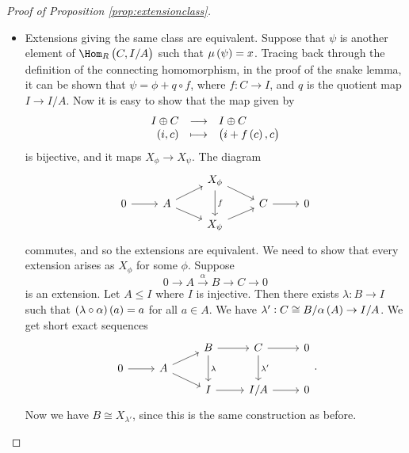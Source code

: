 \begin{proof}[Proof of Proposition \ref{prop:extensionclass}]
\begin{itemize}
From Lemma \ref{lem:extensionclass}, there is a commuting square
$$
\begin{tikzcd}[row sep=tiny]
\Hom_R\br{C, C} \arrow{dr}{\eta} \arrow[swap]{dd}{\overline{\phi}} & \\
& \Ext_R^1\br{C, A} \\
\Hom_R\br{C, I / A} \arrow[swap]{ur}{\mu} &
\end{tikzcd}.
$$
For $ f \in \Hom_R\br{C, C} $, $ \overline{\phi}\br{f} = \phi \circ f $. So the class of the extension
$$ 0 \to A \to B \to C \to 0 $$
is $ \eta\br{\id_C} = \mu\br{\phi \circ \id_C} = \mu\br{\phi} = x $.
\item Extensions giving the same class are equivalent. Suppose that $ \psi $ is another element of $ \Hom_R\br{C, I / A} $ such that $ \mu\br{\psi} = x $. Tracing back through the definition of the connecting homomorphism, in the proof of the snake lemma, it can be shown that $ \psi = \phi + q \circ f $, where $ f : C \to I $, and $ q $ is the quotient map $ I \to I / A $. Now it is easy to show that the map given by
$$ \function{I \oplus C}{I \oplus C}{\br{i, c}}{\br{i + f\br{c}, c}} $$
is bijective, and it maps $ X_\phi \to X_\psi $. The diagram
$$
\begin{tikzcd}[row sep=tiny]
& & X_\phi \arrow{dr} \arrow{dd}{f} & & \\
0 \arrow{r} & A \arrow{ur} \arrow[swap]{dr} & & C \arrow{r} & 0 \\
& & X_\psi \arrow[swap]{ur} & &
\end{tikzcd}
$$
commutes, and so the extensions are equivalent. We need to show that every extension arises as $ X_\phi $ for some $ \phi $. Suppose
$$ 0 \to A \xrightarrow{\alpha} B \to C \to 0 $$
is an extension. Let $ A \le I $ where $ I $ is injective. Then there exists $ \lambda : B \to I $ such that $ \br{\lambda \circ \alpha}\br{a} = a $ for all $ a \in A $. We have $ \lambda' : C \cong B / \alpha\br{A} \to I / A $. We get short exact sequences
$$
\begin{tikzcd}[row sep=tiny]
& & B \arrow{r} \arrow{dd}{\lambda} & C \arrow{r} \arrow{dd}{\lambda'} & 0 \\
0 \arrow{r} & A \arrow{ur} \arrow{dr} & & \\
& & I \arrow{r} & I / A \arrow{r} & 0
\end{tikzcd}.
$$
Now we have $ B \cong X_{\lambda'} $, since this is the same construction as before.



\end{itemize}
\end{proof}

